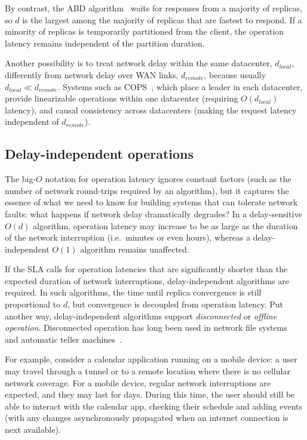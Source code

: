 \documentclass[a4paper,twocolumn,10pt]{article}
\begin{document}
By contrast, the ABD algorithm~\cite{Attiya1995bm} waits for responses from a majority of replicas,
so $d$ is the largest among the majority of replicas that are fastest to respond. If a minority of
replicas is temporarily partitioned from the client, the operation latency remains independent of
the partition duration.

Another possibility is to treat network delay within the same datacenter, $d_\textit{local}$,
differently from network delay over WAN links, $d_\textit{remote}$, because usually
$d_\textit{local} \ll d_\textit{remote}$. Systems such as COPS~\cite{Lloyd2011hz}, which place a
leader in each datacenter, provide linearizable operations within one datacenter (requiring
$O(d_\textit{local})$ latency), and causal consistency across datacenters (making the request
latency independent of $d_\textit{remote}$).


\subsection{Delay-independent operations}\label{sec:disconnected}

The big-$O$ notation for operation latency ignores constant factors (such as the number of network
round-trips required by an algorithm), but it captures the essence of what we need to know for
building systems that can tolerate network faults: what happens if network delay dramatically
degrades? In a delay-sensitive $O(d)$ algorithm, operation latency may increase to be as large as
the duration of the network interruption (i.e.\ minutes or even hours), whereas a delay-independent
$O(1)$ algorithm remains unaffected.

If the SLA calls for operation latencies that are significantly shorter than the expected duration
of network interruptions, delay-independent algorithms are required. In such algorithms, the time
until replica convergence is still proportional to $d$, but convergence is decoupled from operation
latency. Put another way, delay-independent algorithms support \emph{disconnected} or \emph{offline
operation}. Disconnected operation has long been used in network file systems~\cite{Kistler1992bt}
and automatic teller machines~\cite{Brewer2012tr}.

For example, consider a calendar application running on a mobile device: a user may travel through a
tunnel or to a remote location where there is no cellular network coverage. For a mobile device,
regular network interruptions are expected, and they may last for days. During this time, the user
should still be able to interact with the calendar app, checking their schedule and adding events
(with any changes asynchronously propagated when an internet connection is next available).
\end{document}
